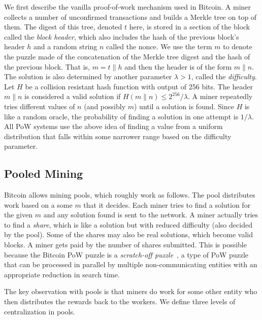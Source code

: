 \documentclass[runningheads]{llncs}
\begin{document}
We first describe the vanilla proof-of-work mechanism used in Bitcoin. A miner collects a number of unconfirmed transactions and builds a Merkle tree on top of them.
The digest of this tree, denoted $t$ here, is stored in a section of the block called the {\em block header}, which also includes the hash of the previous block's header $h$ and a random string $n$ called the nonce. We use the term $m$ to denote the puzzle made of the concatenation of the Merkle tree digest and the hash of the previous block. That is, $m = t\|h$ and
then the header is of the form $m\|n$.
The solution is also determined by another parameter $\lambda > 1$, called the {\em difficulty}. Let $H$ be a collision
resistant hash function with output of 256 bits. 
The header $m\|n$ is considered a valid solution
if $H(m\|n) \leq 2^{256}/\lambda$.
A miner repeatedly tries different values of $n$ (and possibly $m$) until a solution is found. 
Since $H$ is like a random oracle, the probability of finding a solution in one attempt is 
$1 / \lambda$.
All PoW systems use the above idea of finding a value from a uniform distribution that falls within some narrower range based on the difficulty parameter. 

\subsection{Pooled Mining} 
\label{pool-levels}
Bitcoin allows mining pools, which roughly work as follows. The pool distributes work based on a some $m$ that it decides. Each miner tries to find a solution for the given $m$ and any solution found is sent to the network.
A miner actually tries to find a {\em share}, which is like a solution but with reduced difficulty (also decided by the pool). Some of the shares may also be real solutions, which become valid blocks. A miner gets paid by the number of shares submitted. This is possible because the Bitcoin PoW puzzle is a {\em scratch-off puzzle}~\cite{miller2015nonoutsourceable}, a type of PoW puzzle that can be processed in parallel by multiple non-communicating entities with an appropriate reduction in search time. 

The key observation with pools is that miners do work for some other entity who then distributes the rewards back to the workers.
We define three levels of centralization in pools.
\end{document}
